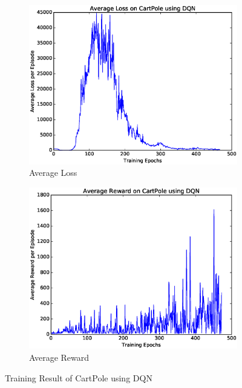 \documentclass[a4paper,UTF8]{article}
\theoremstyle{definition}
\begin{document}
\begin{figure}[H]
	\centering
	\begin{subfigure}[t]{0.5\textwidth}
		\centering
		\includegraphics[scale=0.35]{figures/pole-dqn-loss}
		\caption{Average Loss}
	\end{subfigure}%
	\begin{subfigure}[t]{0.5\textwidth}
		\centering
		\includegraphics[scale=0.35]{figures/pole-dqn-reward}
		\caption{Average Reward}
	\end{subfigure}
	\caption{Training Result of CartPole using DQN}\label{fig:pole-dqn}
\end{figure}
\end{document}
